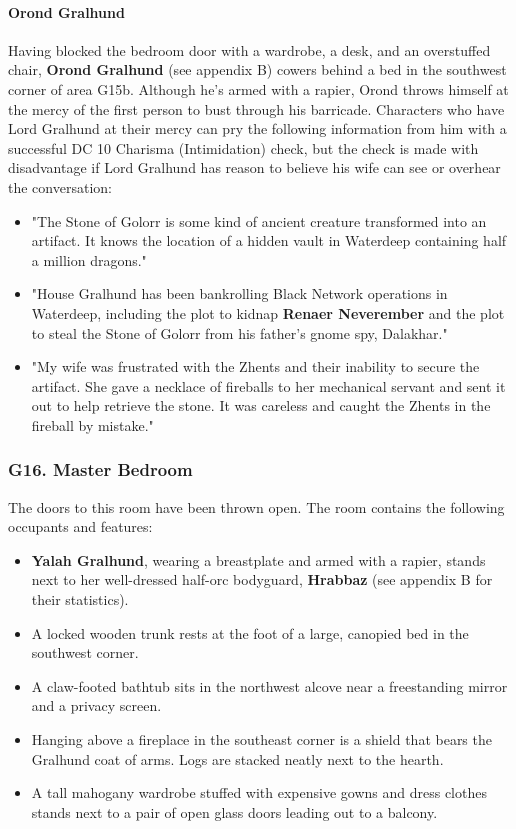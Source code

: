 \documentclass[10pt,a4paper,twoside,twocolumn,openany,nodeprecatedcode]{dndbook}
\begin{document}
\paragraph{Orond Gralhund}
Having blocked the bedroom door with a wardrobe, a desk, and an overstuffed chair, \textbf{Orond Gralhund} (see appendix B) cowers behind a bed in the southwest corner of area G15b. Although he's armed with a rapier, Orond throws himself at the mercy of the first person to bust through his barricade.
Characters who have Lord Gralhund at their mercy can pry the following information from him with a successful DC 10 Charisma (Intimidation) check, but the check is made with disadvantage if Lord Gralhund has reason to believe his wife can see or overhear the conversation:
\begin{itemize}

\item "The Stone of Golorr is some kind of ancient creature transformed into an artifact. It knows the location of a hidden vault in Waterdeep containing half a million dragons."
\item "House Gralhund has been bankrolling Black Network operations in Waterdeep, including the plot to kidnap \textbf{Renaer Neverember} and the plot to steal the Stone of Golorr from his father's gnome spy, Dalakhar."
\item "My wife was frustrated with the Zhents and their inability to secure the artifact. She gave a necklace of fireballs to her mechanical servant and sent it out to help retrieve the stone. It was careless and caught the Zhents in the fireball by mistake."
\end{itemize}


\subsubsection{G16. Master Bedroom}
The doors to this room have been thrown open. The room contains the following occupants and features:
\begin{itemize}

\item \textbf{Yalah Gralhund}, wearing a breastplate and armed with a rapier, stands next to her well-dressed half-orc bodyguard, \textbf{Hrabbaz} (see appendix B for their statistics).
\item A locked wooden trunk rests at the foot of a large, canopied bed in the southwest corner.
\item A claw-footed bathtub sits in the northwest alcove near a freestanding mirror and a privacy screen.
\item Hanging above a fireplace in the southeast corner is a shield that bears the Gralhund coat of arms. Logs are stacked neatly next to the hearth.
\item A tall mahogany wardrobe stuffed with expensive gowns and dress clothes stands next to a pair of open glass doors leading out to a balcony.
\end{itemize}
\end{document}
